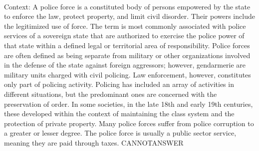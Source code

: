 \documentclass[11pt,a4paper, onecolumn]{article}
\begin{document}
\\ Context: A police force is a constituted body of persons empowered by the state to enforce the law, protect property, and limit civil disorder. Their powers include the legitimized use of force. The term is most commonly associated with police services of a sovereign state that are authorized to exercise the police power of that state within a defined legal or territorial area of responsibility. Police forces are often defined as being separate from military or other organizations involved in the defense of the state against foreign aggressors; however, gendarmerie are military units charged with civil policing. Law enforcement, however, constitutes only part of policing activity. Policing has included an array of activities in different situations, but the predominant ones are concerned with the preservation of order. In some societies, in the late 18th and early 19th centuries, these developed within the context of maintaining the class system and the protection of private property. Many police forces suffer from police corruption to a greater or lesser degree. The police force is usually a public sector service, meaning they are paid through taxes. CANNOTANSWER
\end{document}
